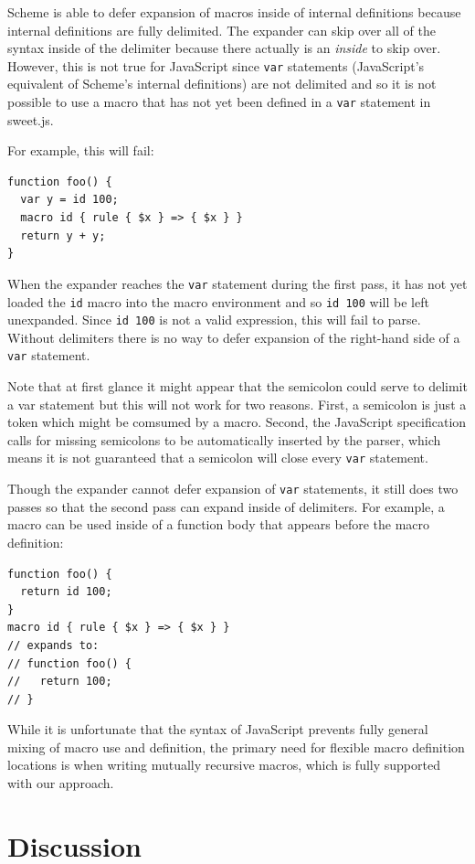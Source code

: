 \documentclass[9pt]{sigplanconf}
\begin{document}
Scheme is able to defer expansion of macros inside of internal
definitions because internal definitions are fully delimited. The
expander can skip over all of the syntax inside of the delimiter
because there actually is an \emph{inside} to skip over. However, this
is not true for JavaScript since \verb!var! statements
(JavaScript's equivalent of Scheme's internal definitions) are not
delimited and so it is not possible to use a macro that has not yet
been defined in a \verb!var! statement in sweet.js.

For example, this will fail:

\begin{lstlisting}
function foo() {
  var y = id 100;
  macro id { rule { $x } => { $x } }
  return y + y;
}
\end{lstlisting}
When the expander reaches the \verb!var! statement during the
first pass, it has not yet loaded the \verb!id! macro into the
macro environment and so \verb!id 100! will be left unexpanded.
Since \verb!id 100! is not a valid expression, this will fail to
parse.
Without delimiters there is no way to defer expansion of the
right-hand side of a \verb!var! statement.

Note that at first glance it might appear that the semicolon could
serve to delimit a var statement but this will not work for two
reasons. First, a semicolon is just a token which might be comsumed by
a macro. Second, the JavaScript specification calls for missing
semicolons to be automatically inserted by the parser, which means
it is not guaranteed that a semicolon will close every \verb!var!
statement.

Though the expander cannot defer expansion of \verb!var!
statements, it still does two passes so that
the second pass can expand inside of delimiters. For example, a macro
can be used inside of a function body that appears before the macro definition:
\begin{lstlisting}
function foo() {
  return id 100;
}
macro id { rule { $x } => { $x } }
// expands to:
// function foo() {
//   return 100;
// }
\end{lstlisting}


While it is unfortunate that the syntax of JavaScript prevents fully
general mixing of macro use and definition, the primary need for
flexible macro definition locations is when writing mutually recursive
macros, which is fully supported with our approach.

\section{Discussion}
\label{sec:discussion}
\end{document}
